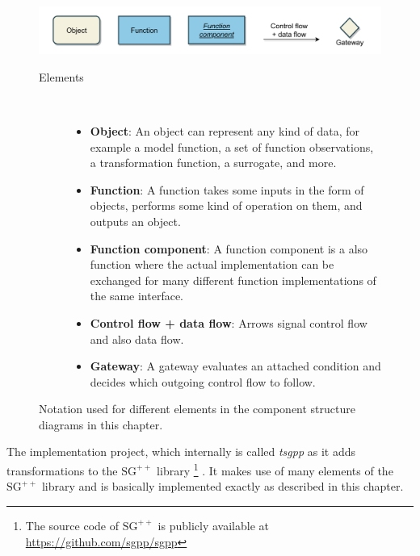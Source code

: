 \documentclass[
  a4paper,  %
  twoside,  %
  bibliography=totoc,
  headsepline,
  cleardoublepage=empty,
  parskip=half,
  draft=false
]{scrbook}
\begin{document}
\begin{mdframed}[style=style,frametitle={Notation}]
\begin{figure}[H]

\includegraphics[width=\textwidth]{graphics/definitions.pdf}
\vspace{-7.5mm}

\delimit

\vspace{3.5mm}

\begin{description}
\item[Elements] {~ \begin{itemize}[\null]
\item \textbf{Object}: An object can represent any kind of data, for example a model function, a set of function observations, a transformation function, a surrogate, and more.
\item \textbf{Function}: A function takes some inputs in the form of objects, performs some kind of operation on them, and outputs an object.
\item \textbf{Function component}: A function component is a also function where the actual implementation can be exchanged for many different function implementations of the same interface.
\item \textbf{Control flow + data flow}: Arrows signal control flow and also data flow.
\item \textbf{Gateway}: A gateway evaluates an attached condition and decides which outgoing control flow to follow.
\end{itemize}}
\end{description}

\delimit

\caption{Notation used for different elements in the component structure diagrams in this chapter.}
\label{fig:defs}
\end{figure}
\end{mdframed}
%
The implementation project, which internally is called \textit{tsgpp} as it adds transformations to the $\mathrm{SG}^{++}$ library \footnote{The source code of $\mathrm{SG}^{++}$ is publicly available at \href{https://github.com/sgpp/sgpp}{https://github.com/sgpp/sgpp}} \cite{Pflueger2010}.
It makes use of many elements of the $\mathrm{SG}^{++}$ library and is basically implemented exactly as described in this chapter.
\end{document}
